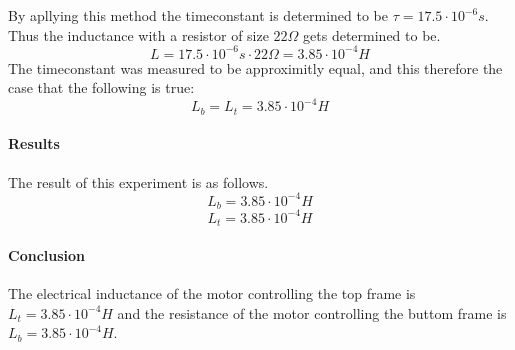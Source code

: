 \documentclass[../../main]{subfiles}
\begin{document}
By apllying this method the timeconstant is determined to be $\tau = 17.5 \cdot 10^{-6}s$. Thus the inductance with a resistor of size $22\Omega$ gets determined to be.\\
$$L = 17.5 \cdot 10^{-6}s \cdot 22 \Omega = 3.85 \cdot 10^{-4}H$$
The timeconstant was measured to be approximitly equal, and this therefore the case that the following is true:\\
$$L_b=L_t=3.85 \cdot 10^{-4}H$$

\paragraph{Results}

The result of this experiment is as follows.
$$L_b = 3.85 \cdot 10^{-4}H$$
$$L_t = 3.85 \cdot 10^{-4}H$$

\paragraph{Conclusion}

The electrical inductance of the motor controlling the top frame is $L_t= 3.85 \cdot 10^{-4}H$ and the resistance of the motor controlling the buttom frame is $L_b= 3.85 \cdot 10^{-4}H$.
\end{document}
